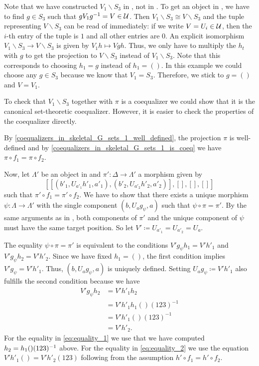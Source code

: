 \begin{exmp}
Note that we have constructed $V_1 \backslash S_3$ in \Gset{}, not in \SkeletalGSets{}. To get an object in \SkeletalGSets{}, we have to find $g \in S_3$ such that $gV_1g^{-1} = V \in \mathcal{U}$. Then $V_1 \backslash S_3 \cong V \backslash S_3$ and the tuple representing $V \backslash S_3$ can be read of immediately: if we write $V = U_i \in \mathcal{U}$, then the $i$-th entry of the tuple is $1$ and all other entries are $0$. An explicit isomorphism $V_1 \backslash S_3 \to V \backslash S_3$ is given by $V_1h \mapsto Vgh$. Thus, we only have to multiply the $h_t$ with $g$ to get the projection to $V \backslash S_3$ instead of $V_1 \backslash S_3$. Note that this corresponds to choosing $h_1 = g$ instead of $h_1 = ()$. In this example we could choose any $g \in S_3$ because we know that $V_1 = S_3$. Therefore, we stick to $g = ()$ and $V = V_1$.

To check that $V_1 \backslash S_3$ together with $\pi$ is a coequalizer we could show that it is the canonical set-theoretic coequalizer. However, it is easier to check the properties of the coequalizer directly.

By \eqref{coequalizers_in_skeletal_G_sets_1_well_defined}, the projection $\pi$ is well-defined and by \eqref{coequalizers_in_skeletal_G_sets_1_is_coeq} we have $\pi \circ f_1 = \pi \circ f_2$. 

Now, let $\Lambda'$ be an object in \SkeletalGSets{} and $\pi'\colon \Delta \to \Lambda'$ a morphism given by \[[ [ ( b'_1, U_{a'_1}h'_1, a'_1 ), ( b'_2, U_{a'_2}h'_2, a'_2 ) ], [], [], [] ]\] such that $\pi' \circ f_1 = \pi' \circ f_2$. We have to show that there exists a unique morphism $\psi \colon \Lambda \to \Lambda'$ with the single component $(b,U_ag_\psi,a)$ such that $\psi \circ \pi = \pi'$. By the same arguments as in , both components of $\pi'$ and the unique component of $\psi$ must have the same target position. So let $V' \coloneqq U_{a'_1} = U_{a'_2} = U_a$.

The equality $\psi \circ \pi = \pi'$ is equivalent to the conditions $V'g_\psi h_1 = V'h'_1$ and $V'g_\psi h_2 = V' h'_2$. Since we have fixed $h_1 = ()$, the first condition implies $V' g_\psi = V'h'_1$. Thus, $(b,U_ag_\psi,a)$ is uniquely defined. Setting $U_ag_\psi \coloneqq V'h'_1$ also fulfills the second condition because we have
\begin{align}
V' g_\psi h_2 &= V' h'_1 h_2 \label{eq:equality_0}\\ 
&= V'h'_1h_1()(123)^{-1} \label{eq:equality_1}\\
&= V'h'_1()(123)^{-1}\\
&= V'h'_2. \label{eq:equality_2}
\end{align}
For the equality in \eqref{eq:equality_1} we use that we have computed $h_2 = h_1()(123)^{-1}$ above. For the equality in \eqref{eq:equality_2} we use the equation $V'h'_1() = V'h'_2(123)$ following from the assumption $h' \circ f_1 = h' \circ f_2$.


\end{exmp}
